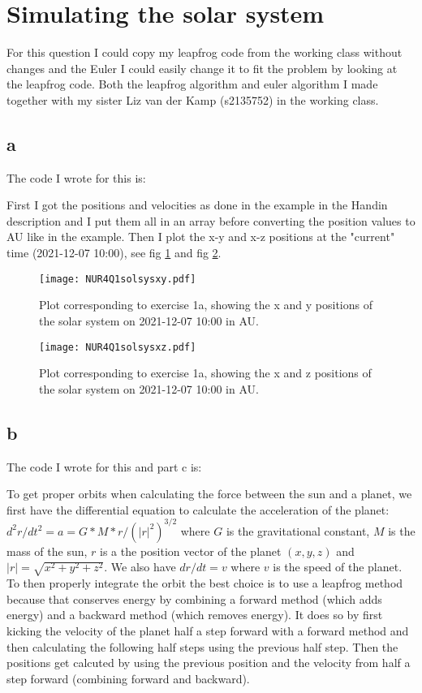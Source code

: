 \section{Simulating the solar system}

For this question I could copy my leapfrog code from the working class without changes and the Euler I could easily change it to fit the problem by looking at the leapfrog code. 
Both the leapfrog algorithm and euler algorithm I made together with my sister Liz van der Kamp (s2135752) in the working class. 

\subsection*{a}

The code I wrote for this is:


First I got the positions and velocities as done in the example in the Handin description and I put them all in an array before converting the position values to AU like in the example. Then I plot the x-y and x-z positions at the "current" time (2021-12-07 10:00), see fig \ref{fig:fig11} and fig \ref{fig:fig12}.

\begin{figure}[h!]
  \centering
  \texttt{[image: NUR4Q1solsysxy.pdf]}
  \caption{Plot corresponding to exercise 1a, showing the x and y positions of the solar system on 2021-12-07 10:00 in AU.}
  \label{fig:fig11}
\end{figure} 


\begin{figure}[h!]
  \centering
  \texttt{[image: NUR4Q1solsysxz.pdf]}
  \caption{Plot corresponding to exercise 1a, showing the x and z positions of the solar system on 2021-12-07 10:00 in AU.}
  \label{fig:fig12}
\end{figure} 


\subsection*{b}

The code I wrote for this and part c is:


To get proper orbits when calculating the force between the sun and a planet, we first have the differential equation to calculate the acceleration of the planet: $d^2r/dt^2 = a = G*M*r/(|r|^2)^{3/2}$ where $G$ is the gravitational constant, $M$ is the mass of the sun, $r$ is a the position vector of the planet $(x,y,z)$ and $|r| = \sqrt{x^2 + y^2 + z^2}$. 
We also have $dr/dt = v$ where $v$ is the speed of the planet. To then properly integrate the orbit the best choice is to use a leapfrog method because that conserves energy by combining a forward method (which adds energy) and a backward method (which removes energy). 
It does so by first kicking the velocity of the planet half a step forward with a forward method and then calculating the following half steps using the previous half step. Then the positions get calcuted by using the previous position and the velocity from half a step forward (combining forward and backward).

